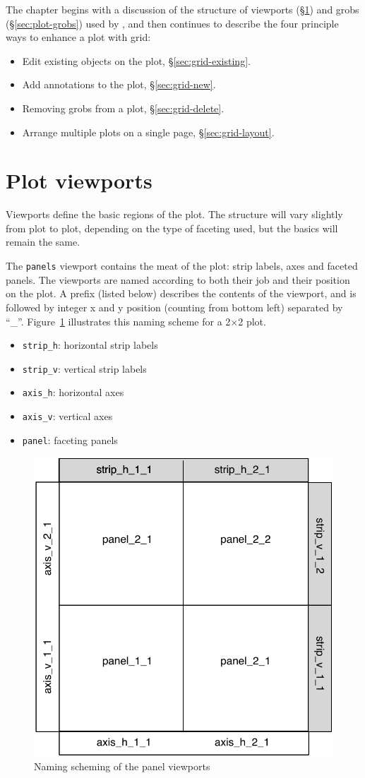 The chapter begins with a discussion of the structure of viewports (\S \ref{sec:plot-viewports}) and grobs (\S \ref{sec:plot-grobs}) used by \ggplot, and then continues to describe the four principle ways to enhance a plot with grid:

\begin{itemize}
  \item Edit existing objects on the plot, \S \ref{sec:grid-existing}.
  \item Add annotations to the plot, \S \ref{sec:grid-new}.
  \item Removing grobs from a plot, \S \ref{sec:grid-delete}.
  \item Arrange multiple plots on a single page, \S \ref{sec:grid-layout}.
\end{itemize}

\section{Plot viewports}
\label{sec:plot-viewports}

Viewports define the basic regions of the plot.  The structure will vary slightly from plot to plot, depending on the type of faceting used, but the basics will remain the same. 

The {\tt panels} viewport contains the meat of the plot: strip labels, axes and faceted panels.  The viewports are named according to both their job and their position on the plot.  A prefix (listed below) describes the contents of the viewport, and is followed by integer x and y position (counting from bottom left) separated by ``\_''.  Figure~\ref{fig:panelvp} illustrates this naming scheme for a 2$\times$2 plot.

\begin{itemize}
  \item {\tt strip\_h}: horizontal strip labels
  \item {\tt strip\_v}: vertical strip labels
  \item {\tt axis\_h}: horizontal axes
  \item {\tt axis\_v}: vertical axes
  \item {\tt panel}: faceting panels
\end{itemize}

\begin{figure}[htbp]
  \centering
    \includegraphics[width=0.5 \textwidth]{grid-panelvp}
  \caption{Naming scheming of the panel viewports}
  \label{fig:panelvp}
\end{figure}

